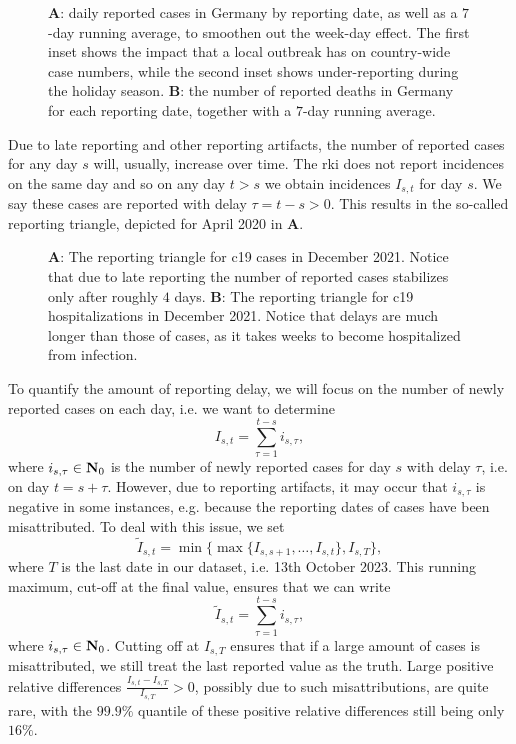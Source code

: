 \begin{figure}
    \resizebox{\textwidth}{!}{%
    }
    \caption{\textbf{A}: daily reported cases in Germany by reporting date, as well as a $7$-day running average, to smoothen out the week-day effect. The first inset shows the impact that a local outbreak \citep{Gunther2020SARSCoV2} has on country-wide case numbers, while the second inset shows under-reporting during the holiday season.  \textbf{B}: the number of reported deaths in Germany for each reporting date, together with a $7$-day running average.}
    \label{fig:cases_germany}
\end{figure}



Due to late reporting and other reporting artifacts, the number of reported cases for any day $s$ will, usually, increase over time. The \acrshort{rki} does not report incidences on the same day and so on any day $t > s$ we obtain incidences $I_{s,t}$ for day $s$. We say these cases are reported with delay $\tau = t -s > 0$. This results in the so-called reporting triangle, depicted for April 2020 in  \textbf{A}. 

\begin{figure}
    \resizebox{\textwidth}{!}{%
    }
    \caption{\textbf{A}: The reporting triangle for \acrshort{c19} cases in December 2021. Notice that due to late reporting the number of reported cases stabilizes only after roughly $4$ days. \textbf{B}: The reporting triangle for \acrshort{c19} hospitalizations in December 2021. Notice that delays are much longer than those of cases, as it takes weeks to become hospitalized from infection.}
    \label{fig:reporting_delays_cases}
\end{figure}

To quantify the amount of reporting delay, we will focus on the number of newly reported cases on each day, i.e. we want to determine
$$
    I_{s,t} = \sum_{\tau = 1}^{t - s} i_{s,\tau},
$$
where $i_{s,\tau} \in \mathbf N_{0}$ is the number of newly reported cases for day $s$ with delay $\tau$, i.e. on day $t = s + \tau$. However, due to reporting artifacts, it may occur that $i_{s,\tau}$ is negative in some instances, e.g. because the reporting dates of cases have been misattributed. To deal with this issue, we set 
$$
    \tilde I_{s,t} = \min \{\max \{I_{s,s + 1}, \dots, I_{s, t}\}, I_{s, T}\},
$$
where $T$ is the last date in our dataset, i.e. 13th October 2023. This running maximum, cut-off at the final value, ensures that we can write 
$$
    \tilde I_{s,t} =  \sum_{\tau = 1}^{t - s} i_{s,\tau},
$$
where $i_{s,\tau} \in \mathbf N_0$. Cutting off at $I_{s,T}$ ensures that if a large amount of cases is misattributed, we still treat the last reported value as the truth. Large positive relative differences $ \frac{I_{s, t} - I_{s,T}}{I_{s,T}} > 0$, possibly due to such misattributions, are quite rare, with the $99.9\%$ quantile of these positive relative differences still being only $16\%$.

